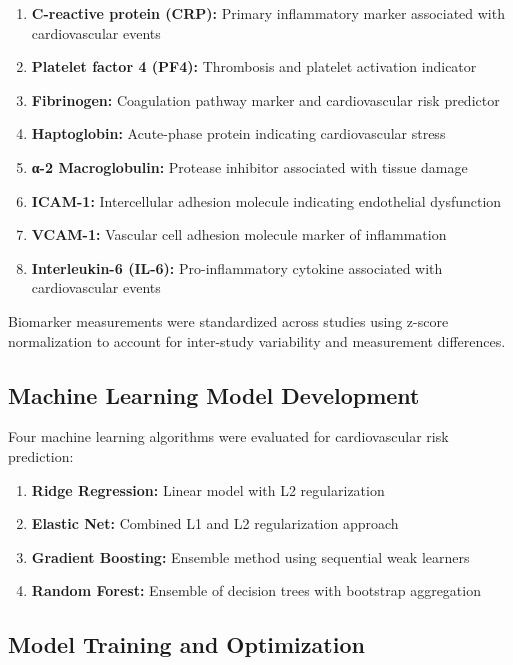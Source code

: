 \documentclass[11pt,a4paper]{article}
\begin{document}
\begin{enumerate}
    \item \textbf{C-reactive protein (CRP):} Primary inflammatory marker associated with cardiovascular events
    \item \textbf{Platelet factor 4 (PF4):} Thrombosis and platelet activation indicator
    \item \textbf{Fibrinogen:} Coagulation pathway marker and cardiovascular risk predictor
    \item \textbf{Haptoglobin:} Acute-phase protein indicating cardiovascular stress
    \item \textbf{α-2 Macroglobulin:} Protease inhibitor associated with tissue damage
    \item \textbf{ICAM-1:} Intercellular adhesion molecule indicating endothelial dysfunction
    \item \textbf{VCAM-1:} Vascular cell adhesion molecule marker of inflammation
    \item \textbf{Interleukin-6 (IL-6):} Pro-inflammatory cytokine associated with cardiovascular events
\end{enumerate}

Biomarker measurements were standardized across studies using z-score normalization to account for inter-study variability and measurement differences.

\subsection{Machine Learning Model Development}

Four machine learning algorithms were evaluated for cardiovascular risk prediction:

\begin{enumerate}
    \item \textbf{Ridge Regression:} Linear model with L2 regularization
    \item \textbf{Elastic Net:} Combined L1 and L2 regularization approach
    \item \textbf{Gradient Boosting:} Ensemble method using sequential weak learners
    \item \textbf{Random Forest:} Ensemble of decision trees with bootstrap aggregation
\end{enumerate}

\subsection{Model Training and Optimization}
\end{document}
